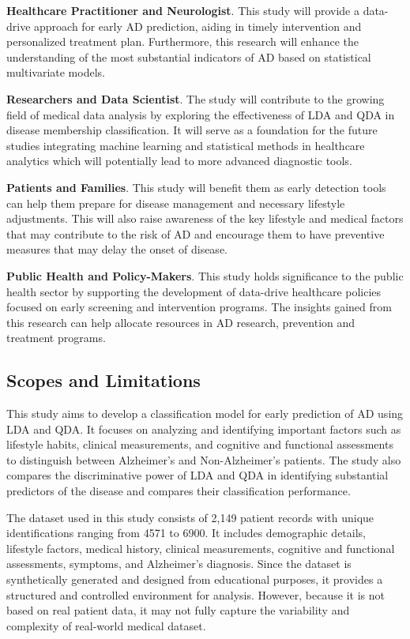 \documentclass[12pt]{article}
\begin{document}
\textbf{Healthcare Practitioner and Neurologist}. This study will provide a data-drive approach for early AD prediction, aiding in timely intervention and personalized treatment plan. Furthermore, 
this research will enhance the understanding of the most substantial indicators of AD based on statistical multivariate models. 

\textbf{Researchers and Data Scientist}. The study will contribute to the growing field of medical data analysis by exploring the effectiveness of LDA and QDA in disease membership classification. It 
will serve as a foundation for the future studies integrating machine learning and statistical methods in healthcare analytics which will potentially lead to more advanced diagnostic tools. 

\textbf{Patients and Families}. This study will benefit them as early detection tools can help them prepare for disease management and necessary lifestyle adjustments. This will also raise awareness of the 
key lifestyle and medical factors that may contribute to the risk of AD and encourage them to have preventive measures that may delay the onset of disease.

\textbf{Public Health and Policy-Makers}. This study holds significance to the public health sector by supporting the development of data-drive healthcare policies focused on early screening and intervention
programs. The insights gained from this research can help allocate resources in AD research, prevention and treatment programs.

\subsection{Scopes and Limitations}
\noindent

This study aims to develop a classification model for early prediction of AD using LDA and QDA. It focuses on analyzing and identifying important factors such as lifestyle habits, clinical measurements, and cognitive and 
functional assessments to distinguish between Alzheimer's and Non-Alzheimer's patients. The study also compares the discriminative power of LDA and QDA in identifying substantial predictors of the disease and compares their 
classification performance. 

The dataset used in this study consists of 2,149 patient records with unique identifications ranging from 4571 to 6900. It includes demographic details, lifestyle factors, medical history, clinical measurements, cognitive and functional
assessments, symptoms, and Alzheimer's diagnosis. Since the dataset is synthetically generated and designed from educational purposes, it provides a structured and controlled environment for analysis. However, because it is not based on real patient data, 
it may not fully capture the variability and complexity of real-world medical dataset. 
\end{document}
